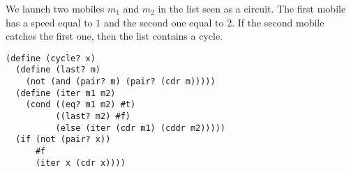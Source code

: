 \documentclass[a4paper,12pt]{article}
\begin{document}
We launch two mobiles $m_1$ and $m_2$ in the list seen as a circuit.
The first mobile has a speed equal to $1$ and the second one equal to
$2$.  If the second mobile catches the first one,  then the list
contains a cycle.
\begin{lstlisting}
(define (cycle? x)
  (define (last? m)
    (not (and (pair? m) (pair? (cdr m)))))
  (define (iter m1 m2)
    (cond ((eq? m1 m2) #t)
          ((last? m2) #f)
          (else (iter (cdr m1) (cddr m2)))))
  (if (not (pair? x))
      #f
      (iter x (cdr x))))
\end{lstlisting}
\end{document}
